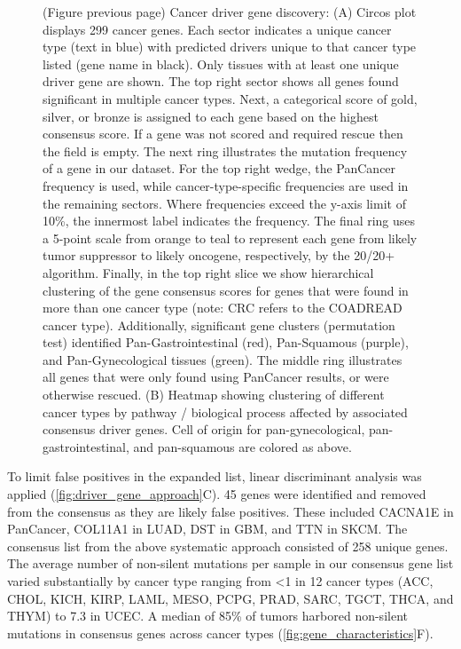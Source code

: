 \begin{figure} [t!]
  \caption[(continued) Cancer driver gene discovery]{(Figure previous page) Cancer driver gene discovery: (A) Circos \cite{RN182} plot displays 299 cancer genes. Each sector indicates a unique cancer type (text in blue) with predicted drivers unique to that cancer type listed (gene name in black). Only tissues with at least one unique driver gene are shown. The top right sector shows all genes found significant in multiple cancer types. Next, a categorical score of gold, silver, or bronze is assigned to each gene based on the highest consensus score. If a gene was not scored and required rescue then the field is empty. The next ring illustrates the mutation frequency of a gene in our dataset. For the top right wedge, the PanCancer frequency is used, while cancer-type-specific frequencies are used in the remaining sectors. Where frequencies exceed the y-axis limit of 10\%, the innermost label indicates the frequency. The final ring uses a 5-point scale from orange to teal to represent each gene from likely tumor suppressor to likely oncogene, respectively, by the 20/20+ algorithm. Finally, in the top right slice we show hierarchical clustering of the gene consensus scores for genes that were found in more than one cancer type (note: CRC refers to the COADREAD cancer type). Additionally, significant gene clusters (permutation test) identified Pan-Gastrointestinal (red), Pan-Squamous (purple), and Pan-Gynecological tissues (green). The middle ring illustrates all genes that were only found using PanCancer results, or were otherwise rescued. (B) Heatmap showing clustering of different cancer types by pathway / biological process affected by associated consensus driver genes. Cell of origin for pan-gynecological, pan-gastrointestinal, and pan-squamous are colored as above.}
\end{figure}

To limit false positives in the expanded list, linear discriminant analysis was applied (\autoref{fig:driver_gene_approach}C). 45 genes were identified and removed from the consensus as they are likely false positives. These included CACNA1E in PanCancer, COL11A1 in LUAD, DST in GBM, and TTN in SKCM. The consensus list from the above systematic approach consisted of 258 unique genes. The average number of non-silent mutations per sample in our consensus gene list varied substantially by cancer type ranging from <1 in 12 cancer types (ACC, CHOL, KICH, KIRP, LAML, MESO, PCPG, PRAD, SARC, TGCT, THCA, and THYM) to 7.3 in UCEC. A median of 85\% of tumors harbored non-silent mutations in consensus genes across cancer types (\autoref{fig:gene_characteristics}F). 

